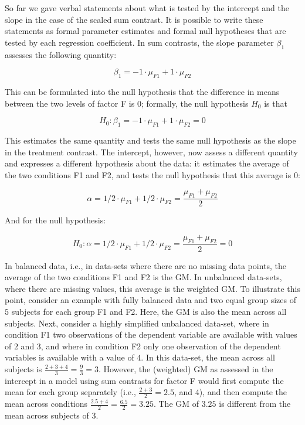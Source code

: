 \documentclass[
  12pt,
]{krantz}
\theoremstyle{definition}
\theoremstyle{definition}
\theoremstyle{definition}
\theoremstyle{definition}
\theoremstyle{remark}
\begin{document}
So far we gave verbal statements about what is tested by the intercept and the slope in the case of the scaled sum contrast. It is possible to write these statements as formal parameter estimates and formal null hypotheses that are tested by each regression coefficient.
In sum contrasts, the slope parameter \(\beta_1\) assesses the following quantity:

\begin{equation}
\beta_1 = -1 \cdot \mu_{F1} + 1 \cdot \mu_{F2}
\end{equation}

\noindent
This can be formulated into the null hypothesis that the difference in means between the two levels of factor F is 0; formally, the null hypothesis \(H_0\) is that

\begin{equation}
H_0: \beta_1 = -1 \cdot \mu_{F1} + 1 \cdot \mu_{F2} = 0
\end{equation}

\noindent
This estimates the same quantity and tests the same null hypothesis as the slope in the treatment contrast.
The intercept, however, now assess a different quantity and expresses a different hypothesis about the data: it estimates the average of the two conditions F1 and F2, and tests the null hypothesis that this average is 0:

\begin{equation}
\alpha = 1/2 \cdot \mu_{F1} + 1/2 \cdot \mu_{F2} = \frac{\mu_{F1} + \mu_{F2}}{2}
\end{equation}

And for the null hypothesis:

\begin{equation}
H_0: \alpha = 1/2 \cdot \mu_{F1} + 1/2 \cdot \mu_{F2} = \frac{\mu_{F1} + \mu_{F2}}{2} = 0
\end{equation}

\noindent
In balanced data, i.e., in data-sets where there are no missing data points, the average of the two conditions F1 and F2 is the GM. In unbalanced data-sets, where there are missing values, this average is the weighted GM.
To illustrate this point, consider an example with fully balanced data and two equal group sizes of \(5\) subjects for each group F1 and F2. Here, the GM is also the mean across all subjects. Next, consider a highly simplified unbalanced data-set, where in condition F1 two observations of the dependent variable are available with values of \(2\) and \(3\), and where in condition F2 only one observation of the dependent variables is available with a value of \(4\). In this data-set, the mean across all subjects is \(\frac{2 + 3 + 4}{3} = \frac{9}{3} = 3\). However, the (weighted) GM as assessed in the intercept in a model using sum contrasts for factor F would first compute the mean for each group separately (i.e., \(\frac{2 + 3}{2} = 2.5\), and \(4\)), and then compute the mean across conditions \(\frac{2.5 + 4}{2} = \frac{6.5}{2} = 3.25\). The GM of \(3.25\) is different from the mean across subjects of \(3\).
\end{document}
